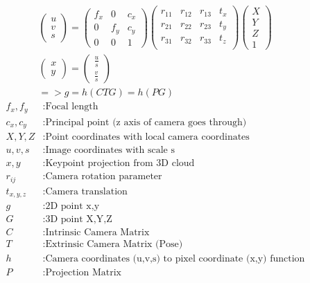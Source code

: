 \documentclass[11pt,a4paper,titlepage,oneside]{report}
\begin{document}
\begin{equation}\label{eq:camera_model}
  \begin{gathered}
    \begin{pmatrix}
      u\\
      v\\
      s
    \end{pmatrix}=
    \begin{pmatrix}
      f_x & 0 & c_x \\
      0 & f_y & c_y \\
      0 & 0 & 1
    \end{pmatrix}
    \begin{pmatrix}
      r_{11} & r_{12} & r_{13} & t_x\\
      r_{21} & r_{22} & r_{23} & t_y\\
      r_{31} & r_{32} & r_{33} & t_z\\
    \end{pmatrix}
    \begin{pmatrix}
      X\\
      Y\\
      Z\\
      1
    \end{pmatrix}\\
    \begin{pmatrix}
      x\\
      y
    \end{pmatrix}=
    \begin{pmatrix}
      \frac{u}{s}\\
      \frac{v}{s}
    \end{pmatrix}\\
    =>g=h(CTG)=h(PG)
  \end{gathered}
\end{equation}
\begin{align*}
  f_x,f_y  &:  \text{Focal length}\\
  c_x,c_y  &:  \text{Principal point (z axis of camera goes through)}\\
  X,Y,Z     &: \text{Point coordinates with local camera coordinates}\\
  u,v,s     &: \text{Image coordinates with scale s}\\
  x,y       &: \text{Keypoint projection from 3D cloud}\\
  r_{ij}    &: \text{Camera rotation parameter}\\
  t_{x,y,z} &: \text{Camera translation}\\
  g         &: \text{2D point x,y}\\
  G         &: \text{3D point X,Y,Z}\\
  C         &: \text{Intrinsic Camera Matrix}\\
  T         &: \text{Extrinsic Camera Matrix (Pose)}\\
  h         &: \text{Camera coordinates (u,v,s) to pixel coordinate (x,y) function}\\
  P         &: \text{Projection Matrix}
\end{align*}
\end{document}
